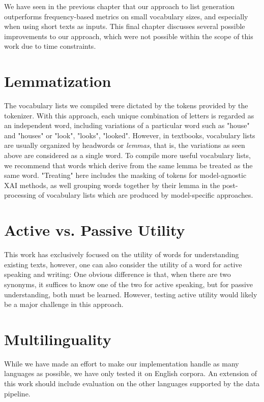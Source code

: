 We have seen in the previous chapter that our approach to list generation outperforms frequency-based metrics on small vocabulary sizes, and especially when using short texts as inputs. 
This final chapter discusses several possible improvements to our approach, which were not possible within the scope of this work due to time constraints.

\section{Lemmatization}
The vocabulary lists we compiled were dictated by the tokens provided by the tokenizer.
With this approach, each unique combination of letters is regarded as an independent word, including variations of a particular word such as "house" and "houses" or "look", "looks", "looked".
However, in textbooks, vocabulary lists are usually organized by headwords or \textit{lemmas}, that is, the variations as seen above are considered as a single word.
To compile more useful vocabulary lists, we recommend that words which derive from the same lemma be treated as the same word.
"Treating" here includes the masking of tokens for model-agnostic XAI methods, as well grouping words together by their lemma in the post-processing of vocabulary lists which are produced by model-specific approaches.

\section{Active vs. Passive Utility}
This work has exclusively focused on the utility of words for understanding existing texts, however, one can also consider the utility of a word for active speaking and writing:
One obvious difference is that, when there are two synonyms, it suffices to know one of the two for active speaking, but for passive understanding, both must be learned.
However, testing active utility would likely be a major challenge in this approach.

\section{Multilinguality}
While we have made an effort to make our implementation handle as many languages as possible, we have only tested it on English corpora.
An extension of this work should include evaluation on the other languages supported by the data pipeline.

